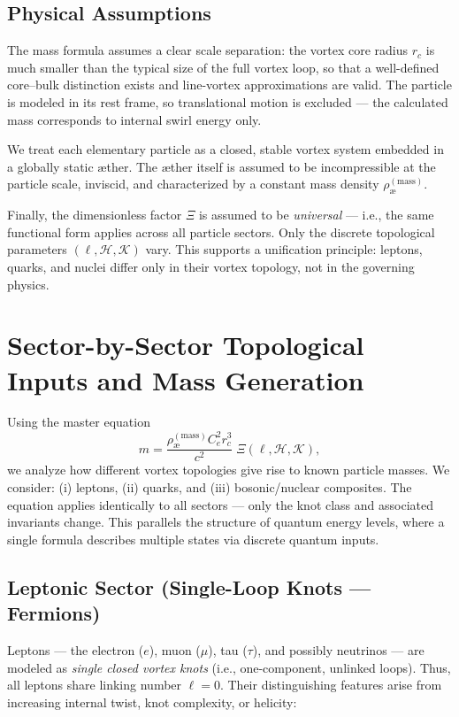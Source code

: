 \subsection{Physical Assumptions}

The mass formula assumes a clear scale separation: the vortex core radius $r_c$ is much smaller than the typical size of the full vortex loop, so that a well-defined core–bulk distinction exists and line-vortex approximations are valid. The particle is modeled in its rest frame, so translational motion is excluded — the calculated mass corresponds to internal swirl energy only.

We treat each elementary particle as a closed, stable vortex system embedded in a globally static æther. The æther itself is assumed to be incompressible at the particle scale, inviscid, and characterized by a constant mass density $\rho_{\text{\ae}}^{(\mathrm{mass})}$.

Finally, the dimensionless factor $\Xi$ is assumed to be \textit{universal} — i.e., the same functional form applies across all particle sectors. Only the discrete topological parameters $(\ell, \mathcal{H}, \mathcal{K})$ vary. This supports a unification principle: leptons, quarks, and nuclei differ only in their vortex topology, not in the governing physics.

\section*{Sector-by-Sector Topological Inputs and Mass Generation}

Using the master equation
\[
    m = \frac{\rho_{\text{\ae}}^{(\mathrm{mass})} C_e^2 r_c^3}{c^2} \; \Xi(\ell, \mathcal{H}, \mathcal{K}),
\]
we analyze how different vortex topologies give rise to known particle masses. We consider: (i) leptons, (ii) quarks, and (iii) bosonic/nuclear composites. The equation applies identically to all sectors — only the knot class and associated invariants change. This parallels the structure of quantum energy levels, where a single formula describes multiple states via discrete quantum inputs.

\subsection{Leptonic Sector (Single-Loop Knots — Fermions)}

Leptons — the electron ($e$), muon ($\mu$), tau ($\tau$), and possibly neutrinos — are modeled as \textit{single closed vortex knots} (i.e., one-component, unlinked loops). Thus, all leptons share linking number $\ell = 0$. Their distinguishing features arise from increasing internal twist, knot complexity, or helicity:

